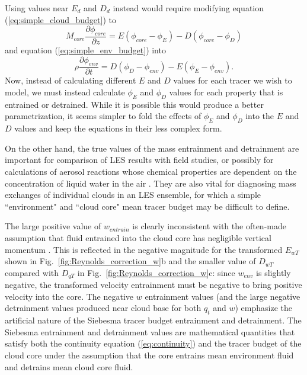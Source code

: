 \documentclass[12pt]{article}
\begin{document}
Using values near $E_d$ and $D_d$ instead would require modifying equation 
(\ref{eq:simple_cloud_budget}) to
\begin{equation}
    \label{eq:less_simple_cloud_budget}
    M_{core} \frac{\partial \phi_{core}}{\partial z} 
       = E(\phi_{core} - \phi_E) - D(\phi_{core} - \phi_D)
\end{equation}
and equation (\ref{eq:simple_env_budget}) into
\begin{equation}
    \label{eq:less_simple_env_budget}
    \rho \frac{\partial \phi_{env}}{\partial t} 
       = D(\phi_D - \phi_{env}) - E(\phi_E - \phi_{env}).
\end{equation}
Now, instead of calculating different $E$ and $D$ values for each tracer we 
wish to model, we must instead calculate $\phi_E$ and $\phi_D$ values for 
each property that is entrained or detrained.  While it is possible this would
produce a better parametrization, it seems simpler to fold the effects of 
$\phi_E$ and $\phi_D$ into the $E$ and $D$ values and keep the equations in 
their less complex form.

On the other hand, the true values of the mass entrainment and detrainment are
important for comparison of LES results with field studies, or possibly for
calculations of aerosol reactions whose chemical properties are dependent on the
concentration of liquid water in the air \citep{Hoppel1994}.  They are also 
vital for diagnosing mass exchanges of individual clouds in an LES ensemble, 
for which a simple ``environment" and ``cloud core" mean tracer budget may be
difficult to define.

The large positive value of $w_{entrain}$ is clearly inconsistent with the
often-made assumption that fluid entrained into the cloud core has negligible
vertical momentum \citep{Simpson1969,Gregory2001,Siebesma2003}.  This is
reflected in the negative magnitude for the transformed $E_{wT}$ shown in 
Fig.~\ref{fig:Reynolds_correction_w}b 
and the smaller value of 
$D_{wT}$ compared with $D_{qT}$ in Fig.~\ref{fig:Reynolds_correction_w}c: 
since $w_{env}$ is slightly negative, the
transformed velocity entrainment must be negative to bring positive velocity 
into the core.  The negative $w$ entrainment values (and the large negative
detrainment values produced near cloud base for both $q_t$ and $w$) emphasize 
the artificial nature of the Siebesma tracer budget entrainment and 
detrainment.  The Siebesma entrainment and detrainment values are mathematical
quantities that satisfy both the continuity equation (\ref{eq:continuity}) and
the tracer budget of the cloud core under the assumption that the core entrains
mean environment fluid and detrains mean cloud core fluid.
\end{document}

